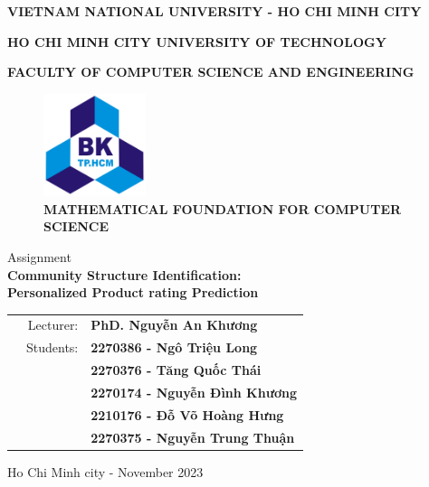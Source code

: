 
\begin{titlepage}
\centerline{\bf \normalsize VIETNAM NATIONAL UNIVERSITY - HO CHI MINH CITY}
\centerline{\bf \normalsize HO CHI MINH CITY UNIVERSITY OF TECHNOLOGY}
\centerline{\bf \normalsize FACULTY OF COMPUTER SCIENCE AND ENGINEERING}
\vspace*{1cm}
\begin{figure}[h!]
	\begin{center}
		\includegraphics[width=3cm]{image/bku.png}
		\\
		\vspace{.5cm}
		\LARGE \textbf{MATHEMATICAL FOUNDATION FOR COMPUTER SCIENCE}
	\end{center}
\end{figure}

\begin{center}
    \Large Assignment
    \\
    \LARGE \textbf{Community Structure Identification:\\Personalized Product rating Prediction} \\
\end{center}

\vspace{3em}

\begin{table}[h]
\begin{tabular}{rrl}
\hspace{2.5 cm} & Lecturer: & \bf PhD. Nguyễn An Khương\\
& Students:  & \bf 2270386 - Ngô Triệu Long\\
& & \bf 2270376 - Tăng Quốc Thái\\
& & \bf 2270174 - Nguyễn Đình Khương\\
& & \bf 2210176 - Đỗ Võ Hoàng Hưng\\
& & \bf 2270375 - Nguyễn Trung Thuận\\
\end{tabular}
\end{table}

\vspace{2.5em}

\vfill
\begin{center}
	{\normalsize Ho Chi Minh city - November 2023}
\end{center}
\end{titlepage}


\newpage

\thispagestyle{empty}